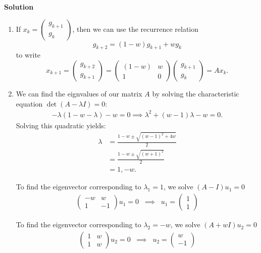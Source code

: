 \documentclass[11pt]{article}
\begin{document}
\noindent \textbf{Solution}\\
\begin{enumerate}
\item If $x_k = \begin{pmatrix} g_{k+1} \\ g_k \end{pmatrix}$, then we can use the recurrence relation 
$$
g_{k+2} = (1-w) g_{k+1} + w g_k
$$
to write
$$
x_{k+1} = \begin{pmatrix} g_{k+2} \\ g_{k+1} \end{pmatrix} = \begin{pmatrix} (1-w) & w \\ 1 & 0 \end{pmatrix} \begin{pmatrix} g_{k+1} \\ g_k \end{pmatrix} = A x_k.
$$

\item We can find the eignvalues of our matrix $A$ by solving the characteristic equation $\det (A-\lambda I) = 0$:
\begin{align}
-\lambda(1-w-\lambda) - w = 0 \implies \lambda^2 + (w-1)\lambda - w =0.
\end{align}
 Solving this quadratic yields:
 \begin{align}
 \lambda &= \frac{1-w \pm \sqrt {(w-1)^2 + 4w}}{2}\\
&= \frac{1-w \pm \sqrt {(w+1)^2 }}{2} \\
&= 1, -w.
\end{align}

To find the eigenvector corresponding to $\lambda_1 = 1$, we solve $(A-I)u_1 = 0$
\begin{align}
\begin{pmatrix} -w & w \\ 1 & -1 \end{pmatrix} u_1 = 0 \;\; \implies \;\; u_1 = \begin{pmatrix} 1 \\ 1 \end{pmatrix}
\end{align}

To find the eigenvector corresponding to $\lambda_2 = -w$, we solve $(A+wI)u_2 = 0$
\begin{align}
\begin{pmatrix} 1 & w \\ 1 & w \end{pmatrix} u_2 = 0 \;\; \implies \;\; u_2 = \begin{pmatrix} w \\ -1 \end{pmatrix}
\end{align}


\end{enumerate}
\end{document}
